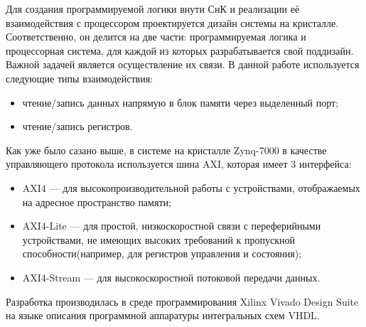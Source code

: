 Для создания программируемой логики внути СнК и реализации её взаимодействия с процессором проектируется дизайн системы на кристалле. Соответственно, он делится на две части: программируемая логика и процессорная система, для каждой из которых разрабатывается свой поддизайн. Важной задачей является осуществление их связи. В данной работе используется следующие типы взаимодействия:
\begin{itemize}
    \item чтение/запись данных напрямую в блок памяти через выделенный порт;
    \item чтение/запись регистров.
\end{itemize}\par
Как уже было сазано выше, в системе на кристалле Zynq-7000 в качестве управляющего протокола используется шина AXI, которая имеет 3 интерфейса:
\begin{itemize}
    \item AXI4 --- для высокопроизводительной работы с устройствами, отображаемых на адресное пространство памяти;
    \item AXI4-Lite --- для простой, низкоскоростной связи с переферийными устройствами, не имеющих высоких требований к пропускной способности(например, для регистров управления и состояния);
    \item AXI4-Stream --- для высокоскоростной потоковой передачи данных.
\end{itemize}\par
Разработка производилась в среде программирования Xilinx Vivado Design Suite на языке описания программной аппаратуры интегральных схем VHDL.
